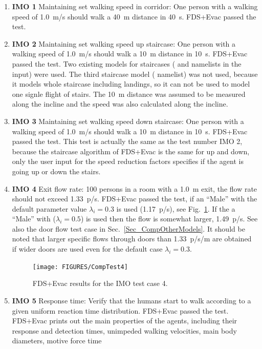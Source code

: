 \documentclass[12pt,a4paper,final,twoside]{stylevk}
\begin{document}
%
\begin{enumerate}
%
\item \textbf{IMO 1} Maintaining set walking speed in corridor: One
  person with a walking speed of 1.0~m/s should walk a 40~m distance
  in 40~s.  FDS+Evac passed the test.
%
\item \textbf{IMO 2} Maintaining set walking speed up staircase: One
  person with a walking speed of 1.0~m/s should walk a 10~m distance
  in 10~s.  FDS+Evac passed the test.  Two existing models for
  staircases ( and  namelists in the
  input) were used.  The third staircase model (
  namelist) was not used, because it models whole staircase including
  landings, so it can not be used to model one signle flight of
  stairs.  The 10~m distance was assumed to be measured along the
  incline and the speed was also calculated along the incline.
%
\item \textbf{IMO 3} Maintaining set walking speed down staircase: One
  person with a walking speed of 1.0~m/s should walk a 10~m distance
  in 10~s.  FDS+Evac passed the test.  This test is actually the same
  as the test number IMO 2, because the staircase algorithm of
  FDS+Evac is the same for up and down, only the user input for the
  speed reduction factors specifies if the agent is going up or down
  the stairs.
%
\item \textbf{IMO 4} Exit flow rate: 100 persons in a room with a
  1.0~m exit, the flow rate should not exceed 1.33~p/s.  FDS+Evac
  passed the test, if an ``Male'' with the default parameter value
  $\lambda_i=0.3$ is used (1.17~p/s), see Fig.~\ref{Fig_CompTest4}.
  If the a ``Male'' with ($\lambda_i=0.5$) is used then the flow is
  somewhat larger, 1.49~p/s.  See also the door flow test case in
  Sec.~\ref{Sec_CompOtherModels}.  It should be noted that larger
  specific flows through doors than 1.33~p/s/m are obtained if wider
  doors are used even for the default case $\lambda_i=0.3$.
%
%
\begin{figure}[!tb]
  \centerline{\texttt{[image: FIGURES/CompTest4]}} 
  \caption{FDS+Evac results for the IMO test case
  4.}\label{Fig_CompTest4}  
\end{figure}
%
%
\item \textbf{IMO 5} Response time: Verify that the humans start to
  walk according to a given uniform reaction time distribution.
  FDS+Evac passed the test.  FDS+Evac prints out the main properties
  of the agents, including their response and detection times,
  unimpeded walking velocities, main body diameters, motive force time

\end{enumerate}
\end{document}
